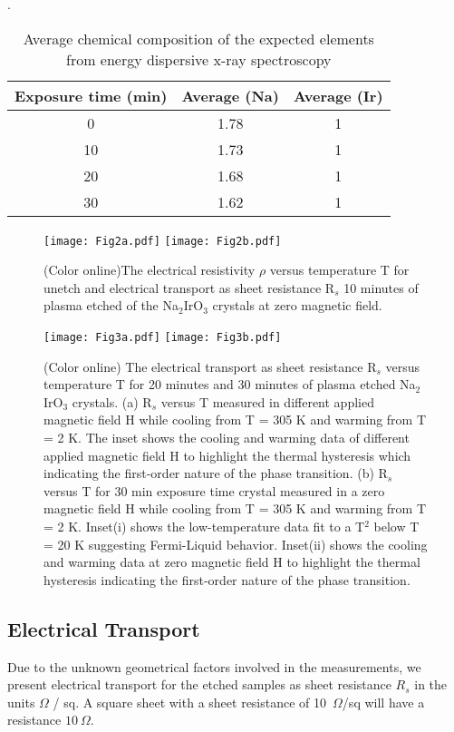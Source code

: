 \documentclass[aps,prb,twocolumn]{revtex4-1}
\begin{document}
\begin{table}
\caption{Average chemical composition of the expected elements from energy dispersive x-ray spectroscopy}. 
\begin{ruledtabular}
\begin{tabular}{|ccc|}
Exposure time (min) & Average (Na) & Average (Ir) \\ \hline  
0  &  1.78 & 1 \\ %
10 & 1.73  & 1 \\ %
20 & 1.68 & 1  \\ %
30 & 1.62 & 1  \\ %
\end{tabular}
\end{ruledtabular}
\label{Table-EDS-parameter}
\end{table}  

\begin{figure}[t]   
\texttt{[image: Fig2a.pdf]}
\texttt{[image: Fig2b.pdf]}      
\caption{(Color online)The electrical resistivity $ \rho $ versus temperature T for unetch and electrical transport as sheet resistance R$ _{s} $ 10 minutes of plasma etched of the  Na$_{2}$IrO$ _{3} $ crystals at zero magnetic field.
\label{Fig-2}}
\end{figure}

\begin{figure}[h]   
\texttt{[image: Fig3a.pdf]}
\texttt{[image: Fig3b.pdf]}      
\caption{(Color online) The electrical transport as sheet resistance R$ _{s} $ versus temperature T for 20 minutes and 30 minutes of plasma etched Na$_{2}$IrO$ _{3} $ crystals. (a) R$ _{s} $ versus T measured in different
applied magnetic field H while cooling from T = 305 K and warming from T = 2 K. The inset shows
the cooling and warming data of different applied magnetic field H to highlight the thermal hysteresis which indicating the first-order nature of the phase transition. (b) R$ _{s} $ versus T  for 30 min exposure time crystal measured in a zero magnetic field H while cooling from T = 305 K and warming from T = 2 K. Inset(i) shows the low-temperature data fit to  a T$ ^{2} $ below T = 20 K suggesting Fermi-Liquid behavior. Inset(ii) shows the cooling and warming data at zero magnetic field H to highlight the thermal hysteresis indicating the first-order nature of the phase transition.  
\label{Fig-3}}
\end{figure}

\subsection{Electrical Transport}
Due to the unknown geometrical factors involved in the measurements, we present electrical transport for the etched samples as sheet resistance $R_s$ in the units $ \Omega $ / sq.  A square sheet with a sheet resistance of 10~$\Omega$/sq will have a resistance $ 10~\Omega $. 
\end{document}
